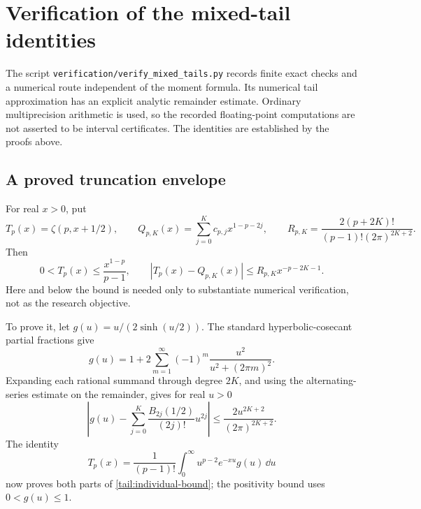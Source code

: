 \section{Verification of the mixed-tail identities}
\label{tail:verification-section}

The script \texttt{verification/verify\_mixed\_tails.py} records
finite exact checks and a numerical route independent of the moment
formula. Its numerical tail approximation has an explicit analytic
remainder estimate. Ordinary multiprecision arithmetic is used, so
the recorded floating-point computations are not asserted to be
interval certificates. The identities are established by the
proofs above.

\subsection{A proved truncation envelope}

For real \(x>0\), put
\[
 T_p(x)=\zeta(p,x+1/2),\qquad
 Q_{p,K}(x)=\sum_{j=0}^{K}c_{p,j}x^{1-p-2j},\qquad
 R_{p,K}=\frac{2(p+2K)!}{(p-1)!(2\pi)^{2K+2}}.
\]
Then
\begin{equation}\label{tail:individual-bound}
 0<T_p(x)\le\frac{x^{1-p}}{p-1},\qquad
 |T_p(x)-Q_{p,K}(x)|\le R_{p,K}x^{-p-2K-1}.
\end{equation}
Here and below the bound is needed only to substantiate numerical
verification, not as the research objective.

To prove it, let \(g(u)=u/(2\sinh(u/2))\). The standard
hyperbolic-cosecant partial fractions \cite[Eq.~4.36.5]{DLMF}
give
\[
 g(u)=1+2\sum_{m=1}^{\infty}
             (-1)^m\frac{u^2}{u^2+(2\pi m)^2}.
\]
Expanding each rational summand through degree \(2K\), and using
the alternating-series estimate on the remainder, gives for real
\(u>0\)
\[
 \left|g(u)-\sum_{j=0}^{K}
        \frac{B_{2j}(1/2)}{(2j)!}u^{2j}\right|
 \le\frac{2u^{2K+2}}{(2\pi)^{2K+2}}.
\]
The identity
\[
 T_p(x)=\frac1{(p-1)!}\int_0^{\infty}
             u^{p-2}e^{-xu}g(u)\,\dd u
\]
now proves both parts of \eqref{tail:individual-bound}; the
positivity bound uses \(0<g(u)\le1\).

